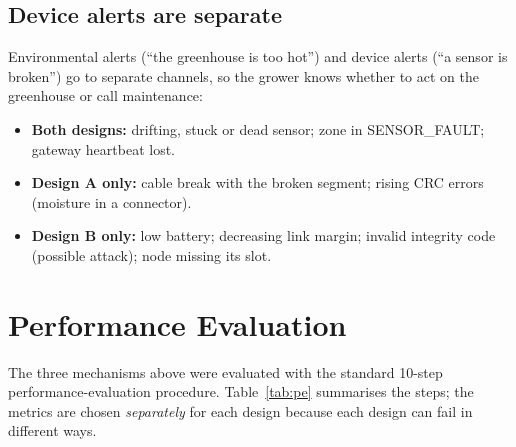 \documentclass[11pt,a4paper]{report}
\begin{document}
\section{Device alerts are separate}
Environmental alerts (``the greenhouse is too hot'') and device alerts (``a sensor is broken'') go to separate channels, so the grower knows whether to act on the greenhouse or call maintenance:
\begin{itemize}[noitemsep]
  \item \textbf{Both designs:} drifting, stuck or dead sensor; zone in SENSOR\_FAULT; gateway heartbeat lost.
  \item \textbf{Design A only:} cable break with the broken segment; rising CRC errors (moisture in a connector).
  \item \textbf{Design B only:} low battery; decreasing link margin; invalid integrity code (possible attack); node missing its slot.
\end{itemize}

\chapter{Performance Evaluation}\label{ch:pe}
The three mechanisms above were evaluated with the standard 10-step performance-evaluation procedure. Table~\ref{tab:pe} summarises the steps; the metrics are chosen \emph{separately} for each design because each design can fail in different ways.
\end{document}
